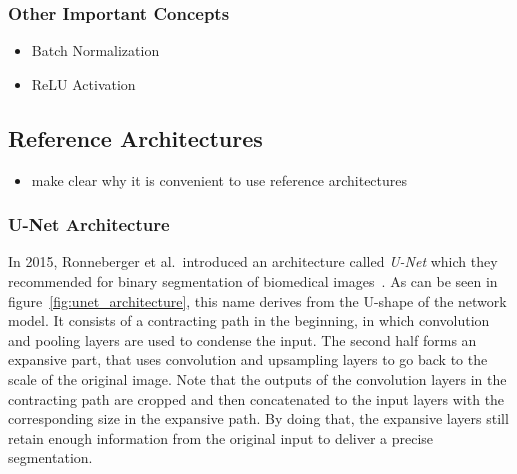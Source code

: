 \subsubsection{Other Important Concepts}
\begin{itemize}
    \item Batch Normalization
    \item ReLU Activation
\end{itemize}

\subsection{Reference Architectures}
\label{sec:ref_archs}
\begin{itemize}
    \item make clear why it is convenient to use reference architectures
\end{itemize}


\subsubsection{U-Net Architecture}
In 2015, Ronneberger et al.\ introduced an architecture called \emph{U-Net} which they recommended for binary segmentation of biomedical images~\cite{unet15}. As can be seen in figure~\ref{fig:unet_architecture}, this name derives from the U-shape of the network model. It consists of a contracting path in the beginning, in which convolution and pooling layers are used to condense the input. The second half forms an expansive part, that uses convolution and upsampling layers to go back to the scale of the original image. Note that the outputs of the convolution layers in the contracting path are cropped and then concatenated to the input layers with the corresponding size in the expansive path. By doing that, the expansive layers still retain enough information from the original input to deliver a precise segmentation.

